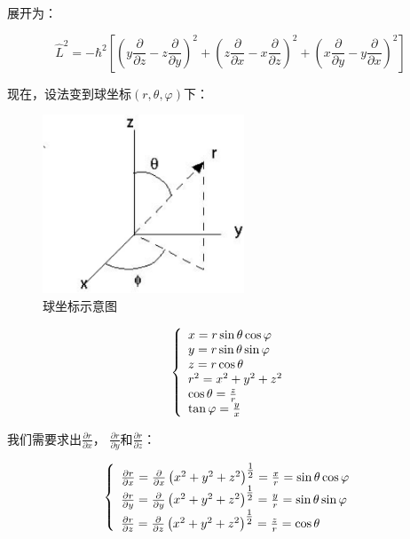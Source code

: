 展开为：

\begin{equation}
\widehat L^2  =  - \hbar ^2 \left[ {\left( {y\frac{\partial }{{\partial z}} - z\frac{\partial }{{\partial y}}} \right)^2  + \left( {z\frac{\partial }{{\partial x}} - x\frac{\partial }{{\partial z}}} \right)^2  + \left( {x\frac{\partial }{{\partial y}} - y\frac{\partial }{{\partial x}}} \right)^2 } \right]
\end{equation}


现在，设法变到球坐标$\left( {r,\theta ,\varphi } \right)$下：


\begin{figure}[h]
\begin{center}
\includegraphics[clip,width=6cm]{AngularMomentum/14-1.ps}
\caption{球坐标示意图}
\end{center}
\end{figure}

\begin{equation}
\left\{ \begin{array}{l}
 x = r\sin \theta \cos \varphi  \\
 y = r\sin \theta \sin \varphi  \\
 z = r\cos \theta  \\
 r^2  = x^2  + y^2  + z^2  \\
 \cos \theta  = {\textstyle{z \over r}} \\
 \tan \varphi  = {\textstyle{y \over x}} \\
 \end{array} \right.
\end{equation} 
 
我们需要求出$\frac{\partial r}{\partial x}$， $\frac{\partial r}{\partial y}$和$\frac{\partial r}{\partial z}$：
 
\begin{equation}
\left\{ \begin{array}{l}
 \frac{{\partial r}}{{\partial x}} = \frac{\partial }{{\partial x}}\left( {x^2  + y^2  + z^2 } \right)^{{\textstyle{1 \over 2}}}  = \frac{x}{r} = \sin \theta \cos \varphi  \\
 \frac{{\partial r}}{{\partial y}} = \frac{\partial }{{\partial y}}\left( {x^2  + y^2  + z^2 } \right)^{{\textstyle{1 \over 2}}}  = \frac{y}{r} = \sin \theta \sin \varphi  \\
 \frac{{\partial r}}{{\partial z}} = \frac{\partial }{{\partial z}}\left( {x^2  + y^2  + z^2 } \right)^{{\textstyle{1 \over 2}}}  = \frac{z}{r} = \cos \theta  \\
\end{array} \right.
\end{equation}

